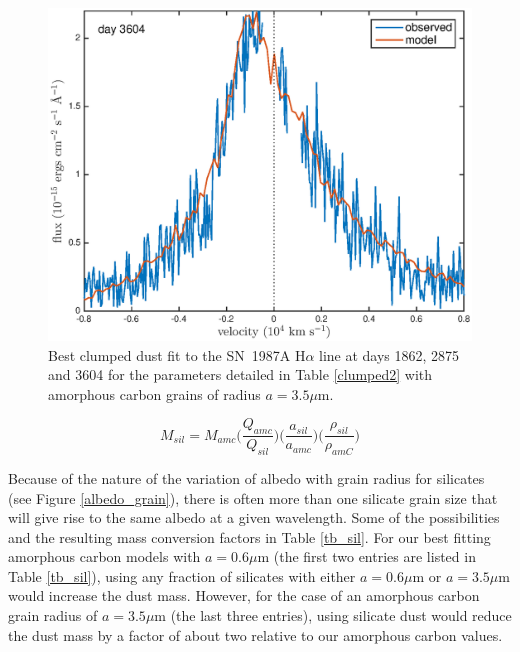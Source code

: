 \documentclass[useAMS,usenatbib,usegraphicx]{mnras}
\begin{document}
\begin{figure}
\includegraphics[trim =55 10 45 15,clip=true,scale=0.35]{clump_1/maximum/d3604Ha}
\caption{Best clumped dust fit to the SN~1987A  H$\alpha$ line at days 1862, 2875 and 
3604 for the parameters detailed in Table \ref{clumped2} with amorphous carbon grains of radius $a=3.5\mu$m.}
\label{d1862_3604_cmax}

\end{figure}

\begin{equation}
M_{sil} = M_{amc} \Big( \frac{Q_{amc}}{Q_{sil}} \Big) \Big(\frac{a_{sil}}{a_{amc}}\Big) \Big(\frac{\rho_{sil}}{\rho_{amC}}\Big)
\end{equation}

Because of the nature of the variation of albedo with grain radius for silicates (see Figure \ref{albedo_grain}), there is often more than one silicate grain size that will give rise to the same albedo at a given wavelength.  Some of the possibilities and the resulting mass conversion factors in Table \ref{tb_sil}.  For our best fitting amorphous carbon models with $a=0.6\mu$m (the first two entries are listed in Table \ref{tb_sil}), using any fraction of silicates with either  $a=0.6\mu$m or $a=3.5\mu$m would increase the dust mass.  However, for the case of an amorphous carbon grain radius of $a=3.5\mu$m (the last three entries), using silicate dust would reduce the dust mass by a factor of about two relative to our amorphous carbon values. 



\end{document}
